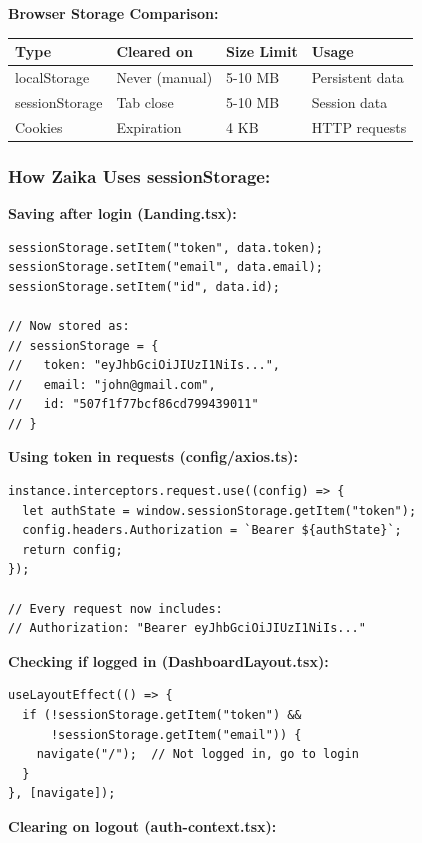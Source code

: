 \documentclass[12pt]{article}
\begin{document}
\textbf{Browser Storage Comparison:}

\begin{center}
\begin{tabular}{|l|l|l|l|}
\hline
\textbf{Type} & \textbf{Cleared on} & \textbf{Size Limit} & \textbf{Usage} \\
\hline
localStorage & Never (manual) & 5-10 MB & Persistent data \\
sessionStorage & Tab close & 5-10 MB & Session data \\
Cookies & Expiration & 4 KB & HTTP requests \\
\hline
\end{tabular}
\end{center}

\subsubsection*{How Zaika Uses sessionStorage:}

\textbf{Saving after login (Landing.tsx):}

\begin{lstlisting}
sessionStorage.setItem("token", data.token);
sessionStorage.setItem("email", data.email);
sessionStorage.setItem("id", data.id);

// Now stored as:
// sessionStorage = {
//   token: "eyJhbGciOiJIUzI1NiIs...",
//   email: "john@gmail.com",
//   id: "507f1f77bcf86cd799439011"
// }
\end{lstlisting}

\textbf{Using token in requests (config/axios.ts):}

\begin{lstlisting}
instance.interceptors.request.use((config) => {
  let authState = window.sessionStorage.getItem("token");
  config.headers.Authorization = `Bearer ${authState}`;
  return config;
});

// Every request now includes:
// Authorization: "Bearer eyJhbGciOiJIUzI1NiIs..."
\end{lstlisting}

\textbf{Checking if logged in (DashboardLayout.tsx):}

\begin{lstlisting}
useLayoutEffect(() => {
  if (!sessionStorage.getItem("token") && 
      !sessionStorage.getItem("email")) {
    navigate("/");  // Not logged in, go to login
  }
}, [navigate]);
\end{lstlisting}

\textbf{Clearing on logout (auth-context.tsx):}
\end{document}
